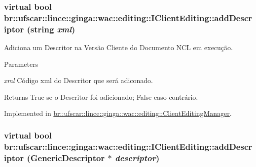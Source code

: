 \hypertarget{classbr_1_1ufscar_1_1lince_1_1ginga_1_1wac_1_1editing_1_1IClientEditing_af7aa3b95abda814fbf7cadbd277dc2c1}{
\subsubsection[{addDescriptor}]{\setlength{\rightskip}{0pt plus 5cm}virtual bool br::ufscar::lince::ginga::wac::editing::IClientEditing::addDescriptor (string {\em xml})}}
\label{classbr_1_1ufscar_1_1lince_1_1ginga_1_1wac_1_1editing_1_1IClientEditing_af7aa3b95abda814fbf7cadbd277dc2c1}


Adiciona um Descritor na Versão Cliente do Documento NCL em execução. 


\begin{DoxyParams}{Parameters}
\item[{\em xml}]Código xml do Descritor que será adiconado. \end{DoxyParams}
\begin{DoxyReturn}{Returns}
True se o Descritor foi adicionado; False caso contrário. 
\end{DoxyReturn}


Implemented in \hyperlink{classbr_1_1ufscar_1_1lince_1_1ginga_1_1wac_1_1editing_1_1ClientEditingManager_ab6fd5b9535b8d6e377aab7b7af4c2902}{br::ufscar::lince::ginga::wac::editing::ClientEditingManager}.

\hypertarget{classbr_1_1ufscar_1_1lince_1_1ginga_1_1wac_1_1editing_1_1IClientEditing_a8fb8afeaa96087d789b6b0efd9571853}{
\subsubsection[{addDescriptor}]{\setlength{\rightskip}{0pt plus 5cm}virtual bool br::ufscar::lince::ginga::wac::editing::IClientEditing::addDescriptor (GenericDescriptor $\ast$ {\em descriptor})}}
\label{classbr_1_1ufscar_1_1lince_1_1ginga_1_1wac_1_1editing_1_1IClientEditing_a8fb8afeaa96087d789b6b0efd9571853}


